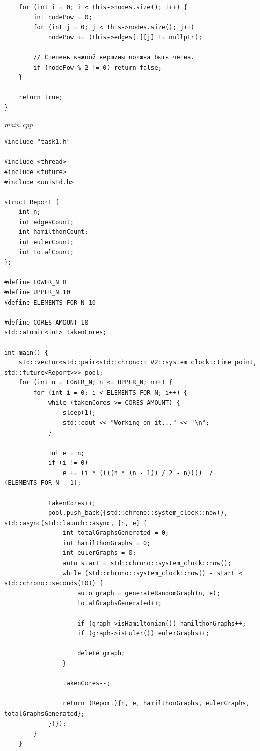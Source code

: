 \documentclass[a4paper,14pt]{extarticle}
\begin{document}
\begin{enumerate}[1.]
\begin{verbatim}
    for (int i = 0; i < this->nodes.size(); i++) {
        int nodePow = 0;
        for (int j = 0; j < this->nodes.size(); j++) 
            nodePow += (this->edges[i][j] != nullptr);

        // Степень каждой вершины должна быть чётна.
        if (nodePow % 2 != 0) return false;
    }

    return true;
}
\end{verbatim}

          \textit{main.cpp}
          \begin{verbatim}
#include "task1.h"

#include <thread>
#include <future>
#include <unistd.h>

struct Report {
    int n;
    int edgesCount;
    int hamilthonCount;
    int eulerCount;
    int totalCount;
};

#define LOWER_N 8
#define UPPER_N 10
#define ELEMENTS_FOR_N 10

#define CORES_AMOUNT 10
std::atomic<int> takenCores;

int main() {
    std::vector<std::pair<std::chrono::_V2::system_clock::time_point, std::future<Report>>> pool;
    for (int n = LOWER_N; n <= UPPER_N; n++) {
        for (int i = 0; i < ELEMENTS_FOR_N; i++) {
            while (takenCores >= CORES_AMOUNT) {
                sleep(1);
                std::cout << "Working on it..." << "\n";
            }

            int e = n;
            if (i != 0)
                e += (i * ((((n * (n - 1)) / 2 - n))))  / (ELEMENTS_FOR_N - 1);

            takenCores++;
            pool.push_back({std::chrono::system_clock::now(), std::async(std::launch::async, [n, e] {
                int totalGraphsGenerated = 0;
                int hamilthonGraphs = 0;
                int eulerGraphs = 0;
                auto start = std::chrono::system_clock::now();
                while (std::chrono::system_clock::now() - start < std::chrono::seconds(10)) {
                    auto graph = generateRandomGraph(n, e);
                    totalGraphsGenerated++;

                    if (graph->isHamiltonian()) hamilthonGraphs++;
                    if (graph->isEuler()) eulerGraphs++;

                    delete graph;
                }

                takenCores--;

                return (Report){n, e, hamilthonGraphs, eulerGraphs, totalGraphsGenerated};
            })});
        }
    }




\end{verbatim}
\end{enumerate}
\end{document}
